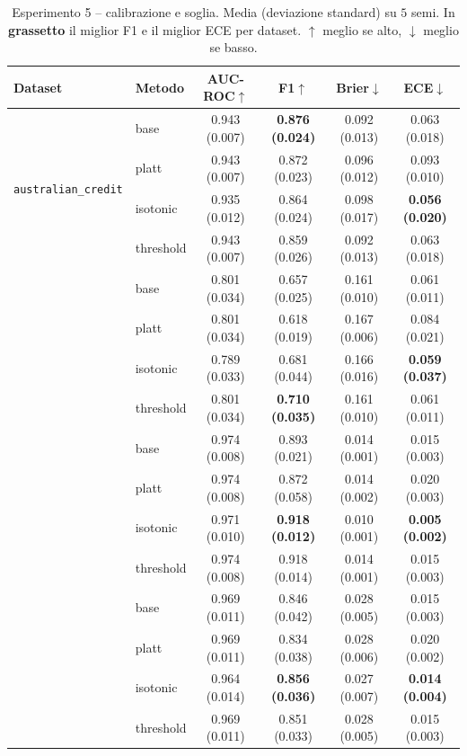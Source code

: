 \documentclass[11pt,a4paper]{article}
\begin{document}
\begin{table}[h]
\centering
\caption{Esperimento 5 -- calibrazione e soglia. Media (deviazione standard)
su $5$ semi. In \textbf{grassetto} il miglior F1 e il miglior ECE per dataset.
$\uparrow$ meglio se alto, $\downarrow$ meglio se basso.}
\label{tab:calib}
\small
\setlength{\tabcolsep}{4pt}
\begin{tabular}{llcccc}
\toprule
Dataset & Metodo & AUC-ROC$\uparrow$ & F1$\uparrow$ & Brier$\downarrow$ & ECE$\downarrow$ \\
\midrule
\multirow{4}{*}{\texttt{australian\_credit}}
 & base      & 0.943 (0.007) & \textbf{0.876 (0.024)} & 0.092 (0.013) & 0.063 (0.018) \\
 & platt     & 0.943 (0.007) & 0.872 (0.023) & 0.096 (0.012) & 0.093 (0.010) \\
 & isotonic  & 0.935 (0.012) & 0.864 (0.024) & 0.098 (0.017) & \textbf{0.056 (0.020)} \\
 & threshold & 0.943 (0.007) & 0.859 (0.026) & 0.092 (0.013) & 0.063 (0.018) \\
\addlinespace
\multirow{4}{*}{\texttt{credit\_g}}
 & base      & 0.801 (0.034) & 0.657 (0.025) & 0.161 (0.010) & 0.061 (0.011) \\
 & platt     & 0.801 (0.034) & 0.618 (0.019) & 0.167 (0.006) & 0.084 (0.021) \\
 & isotonic  & 0.789 (0.033) & 0.681 (0.044) & 0.166 (0.016) & \textbf{0.059 (0.037)} \\
 & threshold & 0.801 (0.034) & \textbf{0.710 (0.035)} & 0.161 (0.010) & 0.061 (0.011) \\
\addlinespace
\multirow{4}{*}{\texttt{polish\_bankruptcy\_1}}
 & base      & 0.974 (0.008) & 0.893 (0.021) & 0.014 (0.001) & 0.015 (0.003) \\
 & platt     & 0.974 (0.008) & 0.872 (0.058) & 0.014 (0.002) & 0.020 (0.003) \\
 & isotonic  & 0.971 (0.010) & \textbf{0.918 (0.012)} & 0.010 (0.001) & \textbf{0.005 (0.002)} \\
 & threshold & 0.974 (0.008) & 0.918 (0.014) & 0.014 (0.001) & 0.015 (0.003) \\
\addlinespace
\multirow{4}{*}{\texttt{polish\_bankruptcy\_5}}
 & base      & 0.969 (0.011) & 0.846 (0.042) & 0.028 (0.005) & 0.015 (0.003) \\
 & platt     & 0.969 (0.011) & 0.834 (0.038) & 0.028 (0.006) & 0.020 (0.002) \\
 & isotonic  & 0.964 (0.014) & \textbf{0.856 (0.036)} & 0.027 (0.007) & \textbf{0.014 (0.004)} \\
 & threshold & 0.969 (0.011) & 0.851 (0.033) & 0.028 (0.005) & 0.015 (0.003) \\
\bottomrule
\end{tabular}
\end{table}
\end{document}
